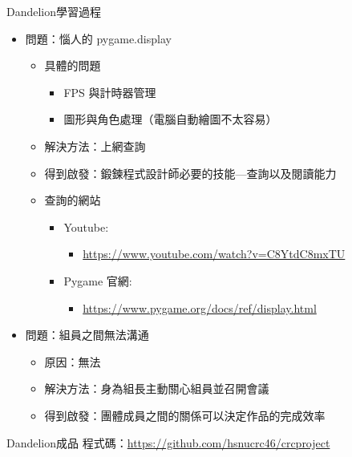 \documentclass{article}
\begin{document}
\begin{large}
\begin{boxpar}{Dandelion}{學習過程}
\begin{itemize}
\begin{itemize}
        \end{itemize}
        \item 問題：惱人的 pygame.display
        \begin{itemize}
            \item 具體的問題
                \begin{itemize}
                    \item FPS 與計時器管理
                    \item 圖形與角色處理（電腦自動繪圖不太容易）
                \end{itemize}
            \item 解決方法：上網查詢
            \item 得到啟發：鍛鍊程式設計師必要的技能—查詢以及閱讀能力
            \item 查詢的網站
                \begin{itemize}
                    \item Youtube:
                    \begin{itemize}
                        \item \url{https://www.youtube.com/watch?v=C8YtdC8mxTU}
                    \end{itemize}
                    \item Pygame 官網:
                        \begin{itemize}
                            \item \url{https://www.pygame.org/docs/ref/display.html}
                        \end{itemize}
                \end{itemize}
        \end{itemize}
    \item 問題：組員之間無法溝通
        \begin{itemize}
            \item 原因：無法
            \item 解決方法：身為組長主動關心組員並召開會議
            \item 得到啟發：團體成員之間的關係可以決定作品的完成效率
        \end{itemize}
\end{itemize}
    \end{boxpar}
\newpage
\begin{boxpar}{Dandelion}{成品}
    程式碼：\url{https://github.com/hsnucrc46/crcproject}\\

\end{boxpar}
\end{large}
\end{document}
